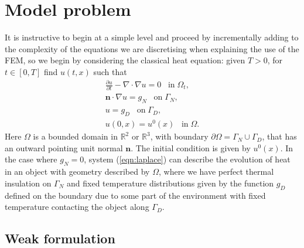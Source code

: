 \section{Model problem}
It is instructive to begin at a simple level and proceed by incrementally adding to the
complexity of the equations we are discretising when explaining the use of the FEM, so
we begin by considering the classical heat equation: given $T>0$, for $t \in[0,T]$ find $u(t,x)$ such that
\begin{subequations}
\begin{align}
\label{eqn:heat_strong}
\frac{\partial u}{\partial t} - \nabla \cdot \nabla u = 0\;\;\; \mbox{in} \; \Omega_{t},\\
\boldsymbol{n} \cdot \nabla u = {g}_{N}   \;\;\; \mbox{on}\; \Gamma_{N},
\\
\label{eqn:heat_dirichlet}
 u = {g}_{D}   \;\;\; \mbox{on}\; \Gamma_{D},
\\
 u(0,x) = u^{0}(x)   \;\;\; \mbox{in}\; \Omega.
\end{align}
\label{eqn:laplace}
\end{subequations}
Here $\Omega$ is a bounded domain in $\mathbb{R}^{2}$ or $\mathbb{R}^{3}$, with boundary $\partial\Omega = \Gamma_{N}  \cup \Gamma_{D} $, that has an outward pointing unit normal $\boldsymbol{n}$. The initial condition is given by $u^{0}(x)$. In the case where ${g}_{N}= 0$, system (\ref{eqn:laplace}) can describe the evolution of heat in an
object with geometry described by $\Omega$, where we have perfect thermal insulation on $\Gamma_{N}$ and fixed temperature distributions given by the function ${g}_{D}$ defined on the boundary due to some part of the environment with fixed temperature contacting the object along $\Gamma_{D}$.

\subsection{Weak formulation}

